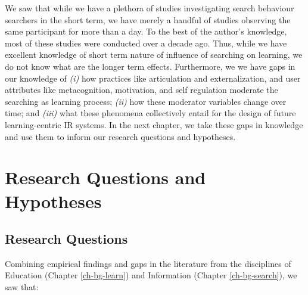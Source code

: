 \documentclass[letterpaper, nobind]{templates/ociamthesis}
\begin{document}
We saw that while we have a plethora of studies investigating search
behaviour searchers in the short term, we have merely a handful of
studies observing the same participant for more than a day. To the best
of the author's knowledge, most of these studies were conducted over a
decade ago. Thus, while we have excellent knowledge of short term nature
of influence of searching on learning, we do not know what are the
longer term effects. Furthermore, we we have gaps in our knowledge of
\emph{(i)} how practices like articulation and externalization, and user
attributes like metacognition, motivation, and self regulation moderate
the searching as learning process; \emph{(ii)} how these moderator variables
change over time; and \emph{(iii)} what these phenomena collectively entail
for the design of future learning-centric IR systems. In the next
chapter, we take these gaps in knowledge and use them to inform our
research questions and hypotheses.

\hypertarget{research-questions-and-hypotheses}{%
\chapter{Research Questions and Hypotheses}\label{research-questions-and-hypotheses}}

\hypertarget{sec-rq}{%
\section{Research Questions}\label{sec-rq}}

Combining empirical findings and gaps in the literature from the disciplines of Education (Chapter \ref{ch-bg-learn}) and Information (Chapter \ref{ch-bg-search}), we saw that:
\end{document}

